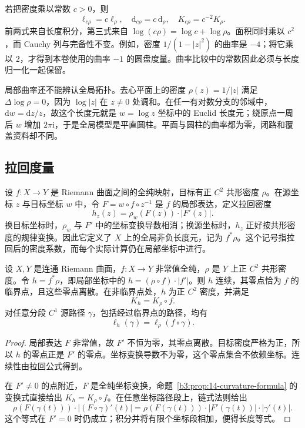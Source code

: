 若把密度乘以常数 \(c>0\)，则
\[
 \ell_{c\rho}=c\ell_\rho,
 \quad \mathrm d_{c\rho}=c\,\mathrm d_\rho,
 \quad K_{c\rho}=c^{-2}K_\rho.
\]
前两式来自长度积分，第三式来自 \(\log(c\rho)=\log c+\log\rho\)。面积同时乘以 \(c^2\)，而 Cauchy 列与完备性不变。例如，密度 \(1/(1-|z|^2)\) 的曲率是 \(-4\)；将它乘以 \(2\)，才得到本卷使用的曲率 \(-1\) 的圆盘度量。曲率比较中的常数因此必须与长度归一化一起保留。

\ProseParagraphBreak
局部曲率还不能辨认全局拓扑。去心平面上的密度 \(\rho(z)=1/|z|\) 满足 \(\Delta\log\rho=0\)，因为 \(\log|z|\) 在 \(z\ne0\) 处调和。在任一有对数分支的邻域中，\(\mathrm dw=\mathrm dz/z\)，故这个长度元就是 \(w=\log z\) 坐标中的 Euclid 长度元；绕原点一周后 \(w\) 增加 \(2\pi\mathrm i\)，于是全局模型是平直圆柱。平面与圆柱的曲率都为零，闭路和覆盖资料却不同。

\subsection{拉回度量}
\label{b3:subsec:140103}

设 \(f:X\to Y\) 是 Riemann 曲面之间的全纯映射，目标有正 \(C^2\) 共形密度 \(\rho\)。在源坐标 \(z\) 与目标坐标 \(w\) 中，令 \(F=w\circ f\circ z^{-1}\) 是 \(f\) 的局部表达，定义拉回密度
\[
 h_z(z)=\rho_w(F(z))\cdot|F'(z)|.
\]
换目标坐标时，\(\rho_w\) 与 \(F'\) 中的坐标变换导数相消；换源坐标时，\(h_z\) 正好按共形密度的规律变换。因此它定义了 \(X\) 上的全局非负长度元，记为 \(f^*\rho\)。这个记号指拉回后的密度系数，而每个实际计算仍在局部坐标中进行。

\begin{proposition}\label{b3:prop:14-pullback-curvature}
设 \(X,Y\) 是连通 Riemann 曲面，\(f:X\to Y\) 非常值全纯，\(\rho\) 是 \(Y\) 上正 \(C^2\) 共形密度。令 \(h=f^*\rho\)，即局部坐标中的 \(h=(\rho\circ f)\cdot|f'|\)。则 \(h\) 连续，其零点恰为 \(f\) 的临界点，且这些零点离散。在非临界点处，\(h\) 为正 \(C^2\) 密度，并满足
\[
 K_h=K_\rho\circ f.
\]
对任意分段 \(C^1\) 源路径 \(\gamma\)，包括经过临界点的路径，均有
\[
 \ell_h(\gamma)=\ell_\rho(f\circ\gamma).
\]
\end{proposition}
\begin{proof}
局部表达 \(F\) 非常值，故 \(F'\) 不恒为零，其零点离散。目标密度严格为正，所以 \(h\) 的零点正是 \(F'\) 的零点。坐标变换导数不为零，这个零点集合不依赖坐标。连续性由拉回公式得到。

在 \(F'\ne0\) 的点附近，\(F\) 是全纯坐标变换，命题~\ref{b3:prop:14-curvature-formula} 的变换式直接给出 \(K_h=K_\rho\circ f\)。在任意坐标路径段上，链式法则给出
\[
 \rho(F(\gamma(t)))\cdot|(F\circ\gamma)'(t)|
 =\rho(F(\gamma(t)))\cdot|F'(\gamma(t))|\cdot|\gamma'(t)|.
\]
这个等式在 \(F'=0\) 时仍成立；积分并将有限个坐标段相加，便得长度等式。
\end{proof}

